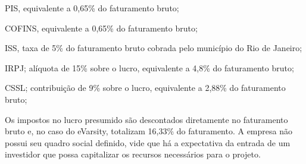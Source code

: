 \documentclass[a4paper, 12pt]{paper}
\begin{document}
PIS, equivalente a 0,65\% do faturamento bruto;

COFINS, equivalente a 0,65\% do faturamento bruto;

ISS, taxa de 5\% do faturamento bruto cobrada pelo município do Rio de Janeiro;

IRPJ; alíquota de 15\% sobre o lucro, equivalente a 4,8\% do faturamento bruto;

CSSL; contribuição de 9\% sobre o lucro, equivalente a 2,88\% do faturamento bruto;

Os impostos no lucro presumido são descontados diretamente no faturamento bruto e, no caso do eVarsity, totalizam 16,33\% do faturamento. A empresa não possui seu quadro social definido, vide que há a expectativa da entrada de um investidor que possa capitalizar os recursos necessários para o projeto.
\end{document}
